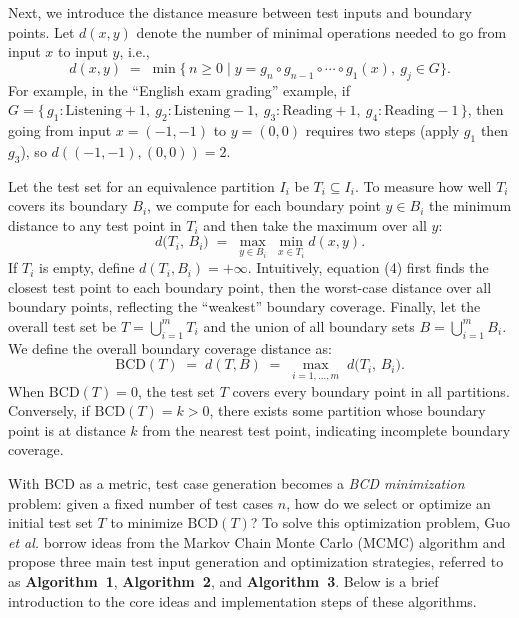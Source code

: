 \documentclass[manuscript,screen,review]{acmart}
\begin{document}
Next, we introduce the distance measure between test inputs and boundary points. Let $d(x,y)$ denote the number of minimal operations needed to go from input $x$ to input $y$, i.e.,
\begin{equation}
d(x,y) \;=\; \min\bigl\{\, n \ge 0 \mid y = g_n \circ g_{n-1} \circ \cdots \circ g_1(x),\ g_j \in G \bigr\}. \tag{3}
\end{equation}
For example, in the ``English exam grading'' example, if $G = \{\, g_1:\text{Listening}+1,\ g_2:\text{Listening}-1,\ g_3:\text{Reading}+1,\ g_4:\text{Reading}-1 \,\}$, then going from input $x = (-1,-1)$ to $y=(0,0)$ requires two steps (apply $g_1$ then $g_3$), so $d((-1,-1),(0,0)) = 2$.

Let the test set for an equivalence partition $I_i$ be $T_i \subseteq I_i$. To measure how well $T_i$ covers its boundary $B_i$, we compute for each boundary point $y \in B_i$ the minimum distance to any test point in $T_i$ and then take the maximum over all $y$:
\begin{equation}
d\bigl(T_i,\, B_i \bigr) \;=\; \max_{y \in B_i} \; \min_{x \in T_i} d(x,y). \tag{4}
\end{equation}
If $T_i$ is empty, define $d(T_i,B_i) = +\infty$. Intuitively, equation (4) first finds the closest test point to each boundary point, then the worst-case distance over all boundary points, reflecting the ``weakest'' boundary coverage. Finally, let the overall test set be $T = \bigcup_{i=1}^m T_i$ and the union of all boundary sets $B = \bigcup_{i=1}^m B_i$. We define the overall boundary coverage distance as:
\begin{equation}
\mathrm{BCD}(T) \;=\; d(T,B) \;=\; \max_{i=1,\ldots,m}\; d\bigl(T_i,\, B_i\bigr). \tag{5}
\end{equation}
When $\mathrm{BCD}(T) = 0$, the test set $T$ covers every boundary point in all partitions. Conversely, if $\mathrm{BCD}(T) = k > 0$, there exists some partition whose boundary point is at distance $k$ from the nearest test point, indicating incomplete boundary coverage.

With BCD as a metric, test case generation becomes a \emph{BCD minimization} problem: given a fixed number of test cases $n$, how do we select or optimize an initial test set $T$ to minimize $\mathrm{BCD}(T)$? To solve this optimization problem, Guo \textit{et al.}\cite{Guo2024} borrow ideas from the Markov Chain Monte Carlo (MCMC) algorithm and propose three main test input generation and optimization strategies, referred to as \textbf{Algorithm~1}, \textbf{Algorithm~2}, and \textbf{Algorithm~3}. Below is a brief introduction to the core ideas and implementation steps of these algorithms.
\end{document}
